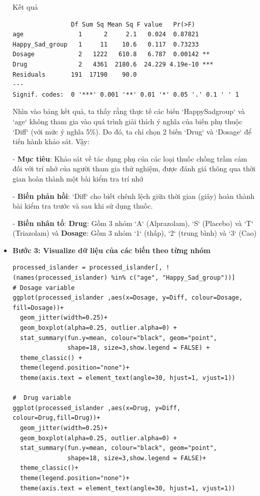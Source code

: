 \begin{itemize}
    Kết quả
    \begin{lstlisting}
                Df Sum Sq Mean Sq F value   Pr(>F)    
age               1      2     2.1   0.024  0.87821    
Happy_Sad_group   1     11    10.6   0.117  0.73233    
Dosage            2   1222   610.8   6.787  0.00142 ** 
Drug              2   4361  2180.6  24.229 4.19e-10 ***
Residuals       191  17190    90.0                     
---
Signif. codes:  0 '***' 0.001 '**' 0.01 '*' 0.05 '.' 0.1 ' ' 1
    \end{lstlisting}
    Nhìn vào bảng kết quả, ta thấy rằng thực tế các biến `HappySadgroup` và `age` không tham gia vào quá trình giải thích ý nghĩa của biến phụ thuộc `Diff` (với mức ý nghĩa 5\%). Do đó, ta chỉ chọn 2 biến `Drug` và `Dosage` để tiến hành khảo sát. Vậy:
    
    - \textbf{Mục tiêu}: Khảo sát về tác dụng phụ của các loại thuốc chống trầm cảm đối với trí nhớ của người tham gia thử nghiệm, được đánh giá thông qua thời gian hoàn thành một bài kiểm tra trí nhớ

    - \textbf{Biến phản hồi}: `Diff` cho biết chênh lệch giữa thời gian (giây) hoàn thành bài kiểm tra trước và sau khi sử dụng thuốc.
    
    - \textbf{Biến nhân tố}: \textbf{Drug}: Gồm 3 nhóm `A` (Alprazolam), `S` (Placebo) và `T` (Triazolam) và \textbf{Dosage}: Gồm 3 nhóm `1` (thấp), `2` (trung bình) và `3` (Cao)

    \item \textbf{Bước 3: Visualize dữ liệu của các biến theo từng nhóm}
    \begin{lstlisting}
processed_islander = processed_islander[, !(names(processed_islander) %in% c("age", "Happy_Sad_group"))]
# Dosage variable
ggplot(processed_islander ,aes(x=Dosage, y=Diff, colour=Dosage, fill=Dosage))+
  geom_jitter(width=0.25)+
  geom_boxplot(alpha=0.25, outlier.alpha=0) +
  stat_summary(fun.y=mean, colour="black", geom="point",
               shape=18, size=3,show.legend = FALSE) +
  theme_classic() +
  theme(legend.position="none")+
  theme(axis.text = element_text(angle=30, hjust=1, vjust=1))

#  Drug variable
ggplot(processed_islander ,aes(x=Drug, y=Diff, colour=Drug,fill=Drug))+
  geom_jitter(width=0.25)+
  geom_boxplot(alpha=0.25, outlier.alpha=0) +
  stat_summary(fun.y=mean, colour="black", geom="point",
               shape=18, size=3,show.legend = FALSE)+
  theme_classic()+
  theme(legend.position="none")+
  theme(axis.text = element_text(angle=30, hjust=1, vjust=1))
    \end{lstlisting}


\end{itemize}
